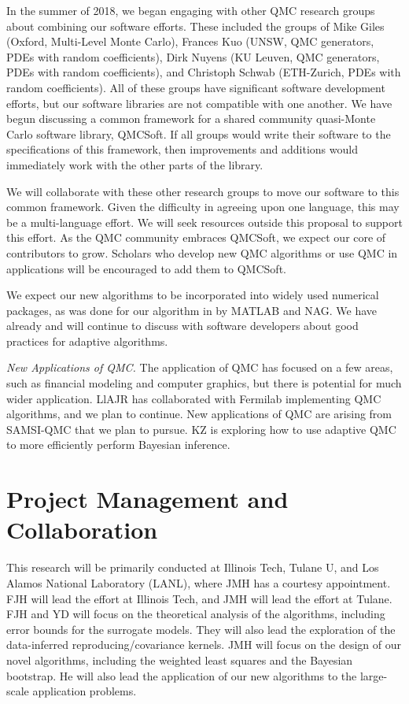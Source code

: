 \documentclass[11pt]{NSFamsart}
\newcommand{\QMCSoft}{QMCSoft\xspace}
\newcommand{\QMC}{QMC\xspace}
\newcommand{\SAMSIQMC}{SAMSI-QMC\xspace}
\newcommand{\NAG}{NAG\xspace}
\newcommand{\MATLAB}{MATLAB\xspace}
\begin{document}
In the summer of 2018, we began engaging with other \QMC research groups about combining our software efforts.  These included the groups of Mike Giles (Oxford, Multi-Level Monte Carlo),  Frances Kuo (UNSW, \QMC generators, PDEs with random coefficients),  Dirk Nuyens (KU Leuven, \QMC generators, PDEs with random coefficients), and Christoph Schwab (ETH-Zurich, PDEs with random coefficients).  All of these groups have significant software development efforts, but our software libraries are not compatible with one another.  We have begun discussing a common framework for a shared community quasi-Monte Carlo software library, \QMCSoft.  If all groups would write their software to the specifications of this framework, then improvements and additions would immediately work with the other parts of the library.

We will collaborate with these other research groups to move our software to this common framework.  Given the difficulty in agreeing upon one language, this may be a multi-language effort.  We will seek resources outside this proposal to support this effort.  As the \QMC community embraces \QMCSoft, we expect our core of contributors to grow.  Scholars who develop new \QMC algorithms or use \QMC in applications will be encouraged to add them to \QMCSoft.  

We expect our new algorithms to be incorporated into widely used numerical packages, as was done for our algorithm in \cite{HonHic00a} by \MATLAB and \NAG.  We have already and will continue 
to discuss with software developers about good practices for adaptive algorithms.


\emph{New Applications of \QMC.}
The application of \QMC has focused on a few areas, such as financial modeling and computer 
graphics, but there is potential for much wider application.  LlAJR has collaborated with Fermilab implementing \QMC algorithms, and we plan to continue.    New applications of \QMC are arising from \SAMSIQMC that we plan to pursue.  KZ is exploring how to use adaptive \QMC to more efficiently perform Bayesian inference.

\section{Project Management and Collaboration}
This research will be primarily conducted at Illinois Tech, Tulane U, and Los Alamos National Laboratory (LANL), where JMH has a courtesy appointment.  FJH will lead the effort at Illinois Tech, and JMH will lead the effort at Tulane.  FJH and YD will focus on the theoretical analysis of the algorithms, including error bounds for the surrogate models.  They will also lead the exploration of the data-inferred reproducing/covariance kernels.  JMH will focus on the design of our novel algorithms, including the weighted least squares and the Bayesian bootstrap.  He will also lead the application of our new algorithms to the large-scale application problems.  
\end{document}
